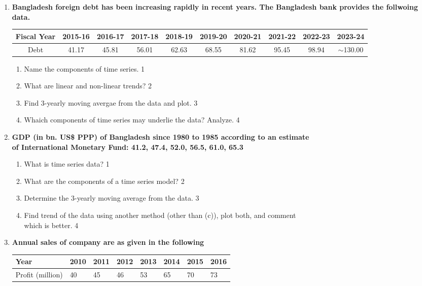 \documentclass[a4paper,oneside]{book}
\begin{document}
\begin{enumerate}
  
     \item
	  \textbf{Bangladesh foreign debt has been increasing rapidly in recent years. The Bangladesh bank provides the follwoing data.}
	  
	  \begin{table}[h]
	  \centering
\begin{tabular}{c|c|c|c|c|c|c|c|c|c}
Fiscal Year & 2015-16 & 2016-17 & 2017-18 & 2018-19 & 2019-20 & 2020-21 & 2021-22 & 2022-23 & 2023-24 \\ \hline
Debt & 41.17 & 45.81 & 56.01 & 62.63 & 68.55 & 81.62 & 95.45 & 98.94 & $\sim$130.00
\end{tabular}
\end{table}
  
  \begin{enumerate}
    \item
	Name the components of time series. \hfill 1
    \item
	What are linear and non-linear trends? \hfill 2
    \item  
	Find 3-yearly moving avergae from the data and plot. \hfill 3
    \item
	Whaich components of time series may underlie the data? Analyze. \hfill 4
  \end{enumerate}

 \item
	  \textbf{GDP (in bn. US\$ PPP) of Bangladesh since 1980 to 1985 according to an estimate \\ of International  Monetary Fund: 41.2, 47.4, 52.0, 56.5, 61.0, 65.3}
  \begin{enumerate}
    \item
	What is time series data? \hfill 1
    \item
	What are the components of a time series model? \hfill 2
    \item  
	Determine the 3-yearly moving average from the data. \hfill 3
    \item
	Find trend of the data using another method (other than (c)), plot both, and comment \\ which is better. \hfill 4
\end{enumerate}

 \item
	  \textbf{Annual sales of company are as given in the following}\
	  
	  \begin{table}[h]
	  \centering
\begin{tabular}{l|l|l|l|l|l|l|l}
Year & 2010 & 2011 & 2012 & 2013 & 2014 & 2015 & 2016 \\ \hline
Profit (million) & 40 & 45 & 46 & 53 & 65 & 70 & 73
\end{tabular}
\end{table}


\end{enumerate}
\end{document}
